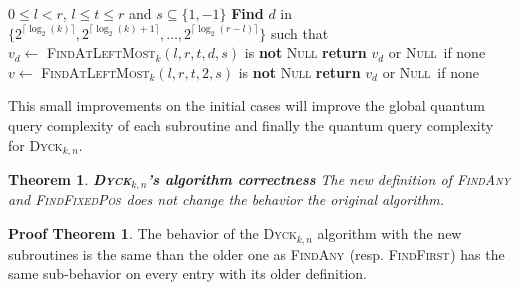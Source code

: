 \documentclass[11pt,a4paper]{article}
\newcommand{\Dyck}[1]{\textsc{Dyck$_{#1}$}}
\newcommand{\FA}[1]{\textsc{FindAny$_{#1}$}}
\newcommand{\FFP}[1]{\textsc{FindFixedPos$_{#1}$}}
\newcommand{\FALM}[1]{\textsc{FindAtLeftMost$_{#1}$}}
\newcommand{\FF}[1]{\textsc{FindFirst$_{#1}$}}
\newcommand{\Null}{\textsc{Null}}
\theoremstyle{definition}
\theoremstyle{plain}
\newtheorem{theorem}{Theorem}[section]
\theoremstyle{definition}
\newtheorem{tproof}{Proof Theorem}[section]
\begin{document}
\begin{algorithm}
    \caption{$\FFP{k}(l,r,t,s)$}\label{alg:ffp_better}
    \begin{algorithmic}
        \Require $0\leq l<r$, $l \leq t \leq r$ and $s \subseteq \{1, -1\}$
        \State \textbf{Find} $d$ in $\{2^{\lceil \log_2(k)\rceil }, 2^{\lceil \log_2(k)+1\rceil },\ldots,2^{\lceil \log_2(r-l)\rceil }\}$
        such that \\
        \hspace*{1cm} $v_d \gets $ \FALM{k}$(l,r,t,d,s)$ is \textbf{not} \Null
        \State \textbf{return} $v_d$ or \Null \ if none
        \Else
        \ $v \gets $ \FALM{k}$(l,r,t,2,s)$ is \textbf{not} \Null
        \State \textbf{return} $v_d$ or \Null \ if none
        \EndIf
    \end{algorithmic}
\end{algorithm}

This small improvements on the initial cases will improve the global
quantum query complexity of each subroutine and finally the quantum
query complexity for \Dyck{k,n}.

\newpage

\begin{theorem}{\textbf{\Dyck{k,n}'s algorithm correctness}} \label{th:subroutine_correctness}
    The new definition of \FA{} and \FFP{} does not change the behavior the original algorithm.
\end{theorem}

\begin{tproof}
    The behavior of the \Dyck{k,n} algorithm with the new subroutines is the same than the older
    one as \FA{} (resp. \FF{}) has the same sub-behavior on every entry with its
    older definition.
\end{tproof}
\end{document}
